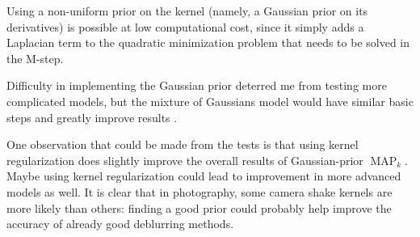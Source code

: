 \documentclass[english,a4paper]{article}
\theoremstyle{plain}
\theoremstyle{definition}
\theoremstyle{remark}
\DeclareMathOperator{\MAP}{MAP}
\begin{document}
Using a non-uniform prior on the kernel (namely, a Gaussian prior on its derivatives) is possible at low computational cost, since it simply adds a Laplacian term to the quadratic minimization problem that needs to be solved in the M-step.

Difficulty in implementing the Gaussian prior deterred me from testing more complicated models, but the mixture of Gaussians model would have similar basic steps and greatly improve results \cite{levin2011efficient}.

One observation that could be made from the tests is that using kernel regularization does slightly improve the overall results of Gaussian-prior $\MAP_k$. 
Maybe using kernel regularization could lead to improvement in more advanced models as well. 
It is clear that in photography, some camera shake kernels are more likely than others: finding a good prior could probably help improve the accuracy of already good deblurring methods.




\end{document}
